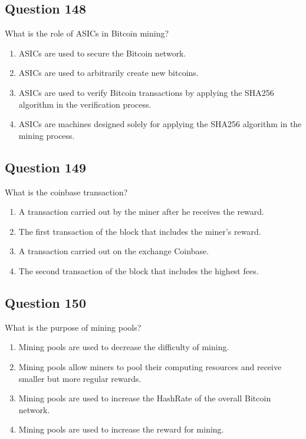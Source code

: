 \documentclass[12pt,a4paper]{article}
\begin{document}
\bigskip


\subsection*{Question 148}
What is the role of ASICs in Bitcoin mining?

\begin{enumerate}[label=\Alph*., leftmargin=*]
\item ASICs are used to secure the Bitcoin network.
\item ASICs are used to arbitrarily create new bitcoins.
\item ASICs are used to verify Bitcoin transactions by applying the SHA256 algorithm in the verification process.
\item ASICs are machines designed solely for applying the SHA256 algorithm in the mining process.
\end{enumerate}

\bigskip


\subsection*{Question 149}
What is the coinbase transaction?

\begin{enumerate}[label=\Alph*., leftmargin=*]
\item A transaction carried out by the miner after he receives the reward.
\item The first transaction of the block that includes the miner's reward.
\item A transaction carried out on the exchange Coinbase.
\item The second transaction of the block that includes the highest fees.
\end{enumerate}

\bigskip


\subsection*{Question 150}
What is the purpose of mining pools?

\begin{enumerate}[label=\Alph*., leftmargin=*]
\item Mining pools are used to decrease the difficulty of mining.
\item Mining pools allow miners to pool their computing resources and receive smaller but more regular rewards.
\item Mining pools are used to increase the HashRate of the overall Bitcoin network.
\item Mining pools are used to increase the reward for mining.
\end{enumerate}
\end{document}
